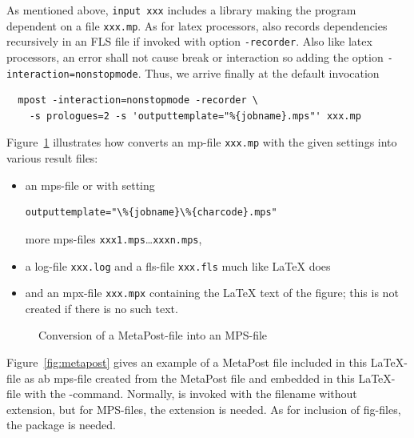 As mentioned above, \texttt{input xxx} includes a library 
making the program dependent on a file \texttt{xxx.mp}. 
As for latex processors, also  records dependencies recursively 
in an FLS file if invoked with option \texttt{-recorder}. 
Also like latex processors, an error shall not cause break or interaction 
so adding the option \texttt{-interaction=nonstopmode}. 
Thus, we arrive finally at the default invocation 
%
\begin{verbatim}
  mpost -interaction=nonstopmode -recorder \
    -s prologues=2 -s 'outputtemplate="%{jobname}.mps"' xxx.mp
\end{verbatim}











Figure~\ref{fig:mp2mps} illustrates 
how  converts an \gls{mp}-file \texttt{xxx.mp} 
with the given settings into various result files: 
%
\begin{itemize}
\item
an \gls{mps}-file or with setting 
\begin{verbatim}outputtemplate="\%{jobname}\%{charcode}.mps"\end{verbatim}
more \gls{mps}-files \texttt{xxx1.mps}\dots \texttt{xxxn.mps}, 
\item
a log-file \texttt{xxx.log} and a fls-file \texttt{xxx.fls} much like \LaTeX{} does 
\item
and an \gls{mpx}-file \texttt{xxx.mpx} containing the \LaTeX{} text of the figure; 
this is not created if there is no such text. 
\end{itemize}



\begin{figure}[htb]
\centering
{}
\caption{\label{fig:mp2mps}Conversion of a MetaPost-file into an MPS-file}
\end{figure}


Figure~\ref{fig:metapost} gives an example of a MetaPost file 
included in this \LaTeX-file as ab mps-file 
created from the MetaPost file 
and embedded in this \LaTeX-file 
with the -command. 
Normally, \cmd{includegraphics} is invoked with the filename without extension, 
but for MPS-files, the extension is needed. 
As for inclusion of fig-files, the package  is needed. 

